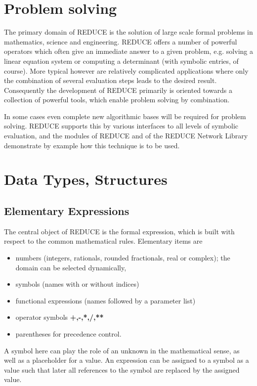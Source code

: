 \section{Problem solving}
 
The primary domain of {\small REDUCE} is the solution of large scale
formal problems in mathematics, science and engineering. {\small REDUCE}
offers a number of powerful operators which often give an immediate answer
to a given problem, e.g. solving a linear equation system or computing a
determinant (with symbolic entries, of course).  More typical however are
relatively complicated applications where only the combination of several
evaluation steps leads to the desired result.  Consequently the
development of {\small REDUCE} primarily is oriented towards a collection
of powerful tools, which enable problem solving by combination.

In some cases even complete new algorithmic bases will be required for
problem solving. {\small REDUCE} supports this by various interfaces to
all levels of symbolic evaluation, and the modules of {\small REDUCE} and
of the {\small REDUCE} Network Library demonstrate by example how this
technique is to be used.
\section{Data Types, Structures}
 
\subsection{Elementary Expressions}

The central object of {\small REDUCE} is the formal expression, which is
built with respect to the common mathematical rules.  Elementary items are

\begin{itemize}
\item numbers (integers, rationals, rounded fractionals, real or
complex); the domain can be selected dynamically,
\item symbols (names with or without indices)
\item functional expressions (names followed by a parameter list)
\item operator symbols {\bf +,-,*,/,**}
\item parentheses for precedence control.
\end{itemize}
 
A symbol here can play the role of an unknown in the mathematical sense,
as well as a placeholder for a value.  An expression can be assigned to a
symbol as a value such that later all references to the symbol are
replaced by the assigned value.

